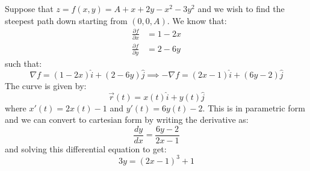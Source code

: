 \begin{itemize}
    \begin{example}
        Suppose that $z=f(x,y) = A + x + 2y - x^2 -3y^2$ and we wish to find the steepest path down starting from $(0,0,A)$. We know that:
        \begin{align}
            \frac{\partial f}{\partial x} &= 1-2x \\ 
            \frac{\partial f}{\partial y} &= 2- 6y
        \end{align}
        such that:
        \begin{equation}
            \nabla f = (1-2x)\hat{i} + (2-6y)\hat{j} \implies -\nabla f = (2x-1)\hat{i}+(6y-2)\hat{j}
        \end{equation}
        The curve is given by:
        \begin{equation}
            \vec{r}(t) = x(t) \hat{i} + y(t)\hat{j}
        \end{equation}
        where $x'(t) = 2x(t)-1$ and $y'(t) = 6y(t)-2$. This is in parametric form and we can convert to cartesian form by writing the derivative as:
        \begin{equation}
            \frac{dy}{dx}=\frac{6y-2}{2x-1}
        \end{equation}
        and solving this differential equation to get:
        \begin{equation}
            3y=(2x-1)^3+1
        \end{equation}
    \end{example}
\end{itemize}